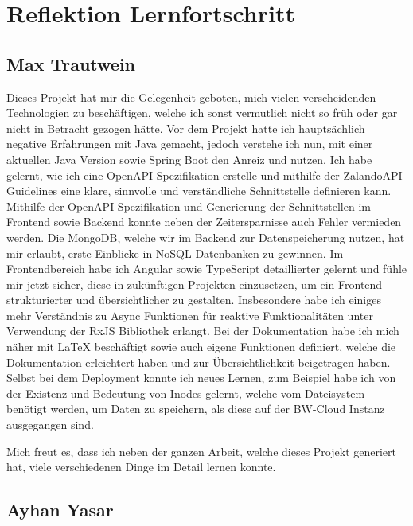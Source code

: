 \chapter{Reflektion Lernfortschritt}\label{ch:reflektion-lernfortschritt}


\section{Max Trautwein}
Dieses Projekt hat mir die Gelegenheit geboten, mich vielen verscheidenden Technologien zu beschäftigen,
welche ich sonst vermutlich nicht so früh oder gar nicht in Betracht gezogen hätte.
Vor dem Projekt hatte ich hauptsächlich negative Erfahrungen mit Java gemacht,
jedoch verstehe ich nun, mit einer aktuellen Java Version sowie Spring Boot den Anreiz und nutzen.
Ich habe gelernt, wie ich eine OpenAPI Spezifikation erstelle und mithilfe der
ZalandoAPI Guidelines eine klare, sinnvolle und verständliche Schnittstelle definieren kann.
Mithilfe der OpenAPI Spezifikation und Generierung der Schnittstellen im Frontend sowie Backend
konnte neben der Zeitersparnisse auch Fehler vermieden werden.
Die MongoDB, welche wir im Backend zur Datenspeicherung nutzen, hat mir erlaubt,
erste Einblicke in NoSQL Datenbanken zu gewinnen.
Im Frontendbereich habe ich Angular sowie TypeScript detaillierter gelernt und fühle mir jetzt sicher,
diese in zukünftigen Projekten einzusetzen, um ein Frontend strukturierter und übersichtlicher zu gestalten.
Insbesondere habe ich einiges mehr Verständnis zu Async Funktionen für reaktive Funktionalitäten
unter Verwendung der RxJS Bibliothek erlangt.
Bei der Dokumentation habe ich mich näher mit LaTeX beschäftigt sowie auch eigene Funktionen definiert,
welche die Dokumentation erleichtert haben und zur Übersichtlichkeit beigetragen haben.
Selbst bei dem Deployment konnte ich neues Lernen, zum Beispiel habe ich von der Existenz und Bedeutung von Inodes gelernt,
welche vom Dateisystem benötigt werden, um Daten zu speichern, als diese auf der BW-Cloud Instanz ausgegangen sind.

Mich freut es, dass ich neben der ganzen Arbeit, welche dieses Projekt generiert hat,
viele verschiedenen Dinge im Detail lernen konnte.


\section{Ayhan Yasar}


